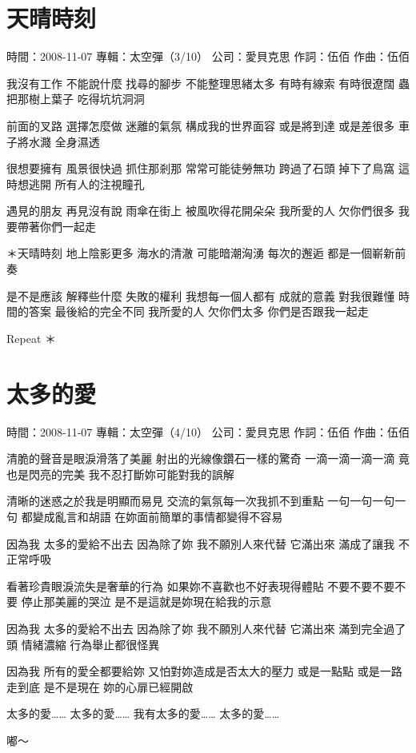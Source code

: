 \documentclass[UTF8,a4paper,oneside,twocolumn,12pt]{ctexbook}
\newcommand{\infopair}[2]{\textbullet #1：#2}
\newcommand{\zc}[1][伍佰]{\infopair{作詞}{#1}}
\newcommand{\zq}[1][伍佰]{\infopair{作曲}{#1}}
\newcommand{\zj}[1]{\infopair{專輯}{#1}}
\newcommand{\sj}[1]{\infopair{時間}{#1}}
\newcommand{\gs}[1]{\infopair{公司}{#1}}
\newenvironment{info}{\begin{flushleft}\kaishu
	}
	{\end{flushleft}\normalsize\yahei\par}
\newenvironment{lyric}{
	}
{}
\begin{document}
\section{天晴時刻}
\begin{info}
	\sj{2008-11-07}
	\zj{太空彈（3/10）}
	\gs{愛貝克思}
	\zc
	\zq
\end{info}
\begin{lyric}
	我沒有工作 不能說什麼
	找尋的腳步 不能整理思緒太多
	有時有線索 有時很遼闊
	蟲把那樹上葉子 吃得坑坑洞洞

	前面的叉路 選擇怎麼做
	迷離的氣氛 構成我的世界面容
	或是將到達 或是差很多
	車子將水濺 全身濕透

	很想要擁有 風景很快過
	抓住那剎那 常常可能徒勞無功
	跨過了石頭 掉下了鳥窩
	這時想逃開 所有人的注視瞳孔

	遇見的朋友 再見沒有說
	雨傘在街上 被風吹得花開朵朵
	我所愛的人 欠你們很多
	我要帶著你們一起走

	＊天晴時刻 地上陰影更多
	海水的清澈 可能暗潮洶湧
	每次的邂逅 都是一個嶄新前奏

	是不是應該 解釋些什麼
	失敗的權利 我想每一個人都有
	成就的意義 對我很難懂
	時間的答案 最後給的完全不同
	我所愛的人 欠你們太多
	你們是否跟我一起走

	Repeat ＊
\end{lyric}

\section{太多的愛}
\begin{info}
	\sj{2008-11-07}
	\zj{太空彈（4/10）}
	\gs{愛貝克思}
	\zc
	\zq
\end{info}
\begin{lyric}
	清脆的聲音是眼淚滑落了美麗
	射出的光線像鑽石一樣的驚奇
	一滴一滴一滴一滴
	竟也是閃亮的完美
	我不忍打斷妳可能對我的誤解

	清晰的迷惑之於我是明顯而易見
	交流的氣氛每一次我抓不到重點
	一句一句一句一句
	都變成亂言和胡語
	在妳面前簡單的事情都變得不容易

	因為我 太多的愛給不出去
	因為除了妳 我不願別人來代替
	它滿出來 滿成了讓我 不正常呼吸

	看著珍貴眼淚流失是奢華的行為
	如果妳不喜歡也不好表現得體貼
	不要不要不要不要
	停止那美麗的哭泣
	是不是這就是妳現在給我的示意

	因為我 太多的愛給不出去
	因為除了妳 我不願別人來代替
	它滿出來 滿到完全過了頭
	情緒濃縮 行為舉止都很怪異

	因為我 所有的愛全都要給妳
	又怕對妳造成是否太大的壓力
	或是一點點 或是一路走到底
	是不是現在 妳的心扉已經開啟

	太多的愛…… 太多的愛……
	我有太多的愛…… 太多的愛……

	嘟～
\end{lyric}
\end{document}
